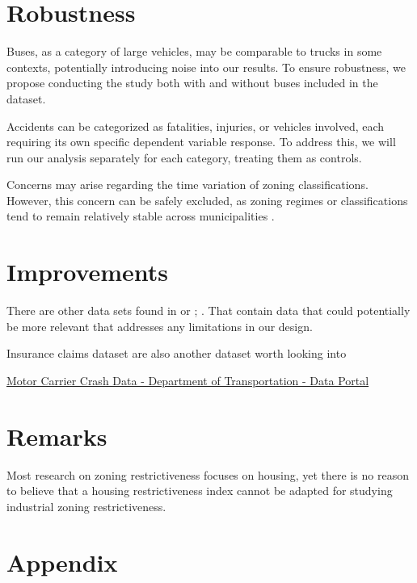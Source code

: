 \documentclass[
  12pt]{article}
\begin{document}
\section{\texorpdfstring{\textbf{Robustness}}{Robustness}}\label{robustness}

Buses, as a category of large vehicles, may be comparable to trucks in
some contexts, potentially introducing noise into our results. To ensure
robustness, we propose conducting the study both with and without buses
included in the dataset.

Accidents can be categorized as fatalities, injuries, or vehicles
involved, each requiring its own specific dependent variable response.
To address this, we will run our analysis separately for each category,
treating them as controls.

Concerns may arise regarding the time variation of zoning
classifications. However, this concern can be safely excluded, as zoning
regimes or classifications tend to remain relatively stable across
municipalities \citep{mclaughlinLandUseRegulation2012}.

\section{\texorpdfstring{\textbf{Improvements}}{Improvements}}\label{improvements}

There are other data sets found in \citep{NHTSAFileDownloads} or
\citep{FatalityAnalysisReporting} ; . That contain data that could
potentially be more relevant that addresses any limitations in our
design.

Insurance claims dataset are also another dataset worth looking into

\href{https://data.transportation.gov/Trucking-and-Motorcoaches/Motor-Carrier-Crash-Data-/b8e5-isfj/about_data}{Motor
Carrier Crash Data - \textbar{} Department of Transportation - Data
Portal}

\section{Remarks}\label{remarks}

Most research on zoning restrictiveness focuses on housing, yet there is
no reason to believe that a housing restrictiveness index cannot be
adapted for studying industrial zoning restrictiveness.

\section{\texorpdfstring{\textbf{Appendix}}{Appendix}}\label{appendix}
\end{document}
